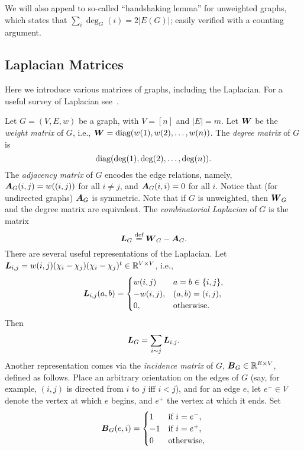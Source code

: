 We will also appeal to so-called ``handshaking lemma'' for unweighted graphs, which states that $\sum_i \deg_G(i) = 2|E(G)|$; easily verified with a counting argument. 


\subsection{Laplacian Matrices}
\label{sec:background_laplacian}
Here we introduce various matrices of graphs, including the Laplacian. For a useful survey of Laplacian see~\cite{merris1994laplacian}.  


Let $G=(V,E,w)$ be a graph, with $V=[n]$ and $|E|=m$. 
Let $\vb*{W}$ be the \emph{weight matrix} of $G$, i.e., $\vb*{W}=\text{diag}(w(1),w(2),\dots,w(n))$. 
The \emph{degree matrix} of $G$ is \[\text{diag}(\deg(1),\deg(2),\dots,\deg(n)).\] The \emph{adjacency matrix} of $G$ encodes the edge relations, namely, $\vb*{A}_G(i,j)=w((i,j))$ for all $i\neq j$, and $\vb*{A}_G(i,i)=0$ for all $i$. Notice that (for undirected graphs) $\vb*{A}_G$ is symmetric.  Note that if $G$ is unweighted, then $\vb*{W}_G$ and the degree matrix are equivalent. 
The \emph{combinatorial Laplacian} of $G$ is the matrix 
\begin{equation}
\label{eq:L_G}
\vb*{L}_G\overset{\text{def}}{=} \vb*{W}_G-\vb*{A}_G.
\end{equation}
There are several useful representations of the Laplacian. Let $\vb*{L}_{i,j}=w(i,j)(\chi_i-\chi_j) (\chi_i-\chi_j)^t\in \mathbb{R}^{V\times V}$, i.e., 
\[\vb*{L}_{i,j}(a,b)=\begin{cases}
w(i,j)&a=b\in\{i,j\},\\
-w(i,j),&(a,b)=(i,j),\\
0,&\text{otherwise}.
\end{cases}\]
Then 
\begin{equation}
\label{eq:Lsum}
    \vb*{L}_G=\sum_{i\sim j}\vb*{L}_{i,j}.
\end{equation}
Another representation comes via the \emph{incidence matrix} of $G$, $\vb*{B}_G\in \mathbb{R}^{E\times V}$, defined as follows. Place an arbitrary orientation on the edges of $G$ (say, for example, $(i,j)$ is directed from $i$ to $j$ iff $i<j$), and for an edge $e$, let $e^-\in V$ denote the vertex at which $e$ begins, and $e^+$ the vertex at which it ends. Set 
\begin{equation}
\label{eq:B_G}
\vb*{B}_G(e,i)=\begin{cases}
1&\text{if }i=e^-,\\
-1&\text{if }i=e^+,\\
0&\text{otherwise},
\end{cases}
\end{equation}
